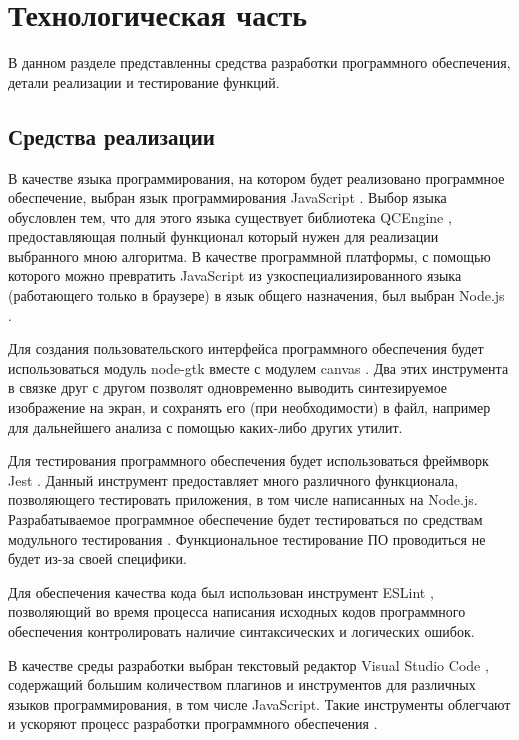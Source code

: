\chapter{Технологическая часть}

В данном разделе представленны средства разработки программного обеспечения, детали реализации и тестирование функций.

\section{Средства реализации}

В качестве языка программирования, на котором будет реализовано программное обеспечение, выбран язык программирования JavaScript \cite{js}. Выбор языка обусловлен тем, что для этого языка существует библиотека QCEngine \cite{qcengine}, предоставляющая полный функционал который нужен для реализации выбранного мною алгоритма. В качестве программной платформы, с помощью которого можно превратить JavaScript из узкоспециализированного языка (работающего только в браузере) в язык общего назначения, был выбран Node.js \cite{nodejs}.

Для создания пользовательского интерфейса программного обеспечения будет использоваться модуль node-gtk \cite{node-gtk} вместе с модулем canvas \cite{node-canvas}. Два этих инструмента в связке друг с другом позволят одновременно выводить синтезируемое изображение на экран, и сохранять его (при необходимости) в файл, например для дальнейшего анализа с помощью каких-либо других утилит.

Для тестирования программного обеспечения будет использоваться фреймворк Jest \cite{jest}. Данный инструмент предоставляет много различного функционала, позволяющего тестировать приложения, в том числе написанных на Node.js. Разрабатываемое программное обеспечение будет тестироваться по средствам модульного тестирования \cite{utests}. Функциональное тестирование \cite{ftests} ПО проводиться не будет из-за своей специфики.

Для обеспечения качества кода был использован инструмент ESLint \cite{eslint}, позволяющий во время процесса написания исходных кодов программного обеспечения контролировать наличие синтаксических и логических ошибок.

В качестве среды разработки выбран текстовый редактор Visual Studio Code \cite{vscode}, содержащий большим количеством плагинов и инструментов для различных языков программирования, в том числе JavaScript. Такие инструменты облегчают и ускоряют процесс разработки программного обеспечения \cite{why-ide}.


